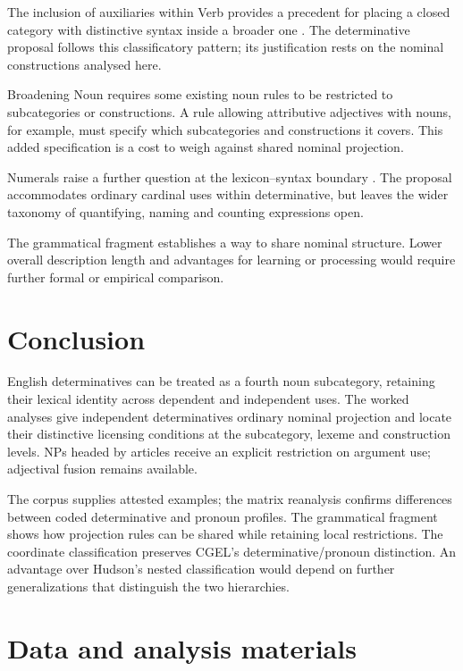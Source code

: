 \documentclass[12pt]{article}
\begin{document}
The inclusion of auxiliaries within Verb provides a precedent for placing a closed category with distinctive syntax inside a broader one \citep{pullumwilson1977}. The determinative proposal follows this classificatory pattern; its justification rests on the nominal constructions analysed here.

Broadening Noun requires some existing noun rules to be restricted to subcategories or constructions. A rule allowing attributive adjectives with nouns, for example, must specify which subcategories and constructions it covers. This added specification is a cost to weigh against shared nominal projection.

Numerals raise a further question at the lexicon--syntax boundary \citep{reynolds2026numerals}. The proposal accommodates ordinary cardinal uses within determinative, but leaves the wider taxonomy of quantifying, naming and counting expressions open.

The grammatical fragment establishes a way to share nominal structure. Lower overall description length and advantages for learning or processing would require further formal or empirical comparison.

\section{Conclusion}\label{sec:conclusion}

English determinatives can be treated as a fourth noun subcategory, retaining their lexical identity across dependent and independent uses. The worked analyses give independent determinatives ordinary nominal projection and locate their distinctive licensing conditions at the subcategory, lexeme and construction levels. NPs headed by articles receive an explicit restriction on argument use; adjectival fusion remains available.

The corpus supplies attested examples; the matrix reanalysis confirms differences between coded determinative and pronoun profiles. The grammatical fragment shows how projection rules can be shared while retaining local restrictions. The coordinate classification preserves CGEL's determinative/pronoun distinction. An advantage over Hudson's nested classification would depend on further generalizations that distinguish the two hierarchies.

\section*{Data and analysis materials}
\end{document}
